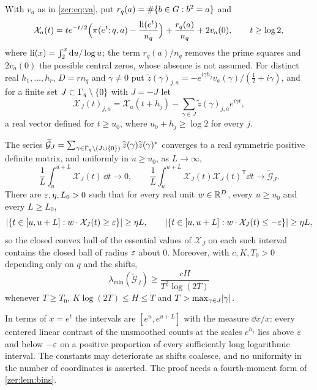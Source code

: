 With $v_a$ as in \eqref{zer:eq:va}, put $r_q(a)=\#\{b\in G:b^2=a\}$ and
\[
 \mathcal X_a(t)=te^{-t/2}\Bigl(\pi(e^t;q,a)-\frac{\operatorname{li}(e^t)}{n_q}\Bigr)+\frac{r_q(a)}{n_q}+2v_a(0),
 \qquad t\ge\log2,
\]
where $\operatorname{li}(x)=\int_2^x\mathrm{d} u/\log u$; the term $r_q(a)/n_q$ removes the prime squares and $2v_a(0)$ the
possible central zeros, whose absence is not assumed. For distinct real $h_1,\dots,h_r$, $D=rn_q$ and
$\gamma\ne0$ put $\widetilde z(\gamma)_{j,a}=-e^{i\gamma h_j}v_a(\gamma)/(\tfrac12+i\gamma)$, and for a
finite set $J\subset\Gamma_q\setminus\{0\}$ with $J=-J$ let
\[
 \mathcal X_J(t)_{j,a}=\mathcal X_a(t+h_j)-\sum_{\gamma\in J}\widetilde z(\gamma)_{j,a}e^{i\gamma t},
\]
a real vector defined for $t\ge u_0$, where $u_0+h_j\ge\log2$ for every $j$.

\begin{theorem}\label{zer:thm:unsmoothed}
The series $\widetilde{\mathcal G}_J=\sum_{\gamma\in\Gamma_q\setminus(J\cup\{0\})}\widetilde z(\gamma)\widetilde z(\gamma)^*$
converges to a real symmetric positive definite matrix, and uniformly in $u\ge u_0$, as $L\to\infty$,
\[
 \frac1L\int_u^{u+L}\mathcal X_J(t)\,\dd t\to0,\qquad
 \frac1L\int_u^{u+L}\mathcal X_J(t)\mathcal X_J(t)^{\mathsf T}\dd t\to\widetilde{\mathcal G}_J .
\]
There are $\varepsilon,\eta,L_0>0$ such that for every real unit $w\in\mathbb{R}^D$, every $u\ge u_0$ and every
$L\ge L_0$,
\[
 \lvert\{t\in[u,u+L]:w\cdot\mathcal X_J(t)\ge\varepsilon\}\rvert\ge\eta L,\qquad
 \lvert\{t\in[u,u+L]:w\cdot\mathcal X_J(t)\le-\varepsilon\}\rvert\ge\eta L,
\]
so the closed convex hull of the essential values of $\mathcal X_J$ on each such interval contains the
closed ball of radius $\varepsilon$ about $0$. Moreover, with $c,K,T_0>0$ depending only on $q$ and the
shifts,
\[
 \lambda_{\min}(\widetilde{\mathcal G}_J)\ge\frac{cH}{T^2\log(2T)}
\]
whenever $T\ge T_0$, $K\log(2T)\le H\le T$ and $T>\max_{\gamma\in J}\lvert\gamma\rvert$.
\end{theorem}

In terms of $x=e^t$ the intervals are $[e^u,e^{u+L}]$ with the measure $\dd x/x$: every centered
linear contrast of the unsmoothed counts at the scales $e^{h_j}$ lies above $\varepsilon$ and below $-\varepsilon$ on
a positive proportion of every sufficiently long logarithmic interval. The constants may deteriorate
as shifts coalesce, and no uniformity in the number of coordinates is asserted. The proof needs a
fourth-moment form of \cref{zer:lem:bins}.

